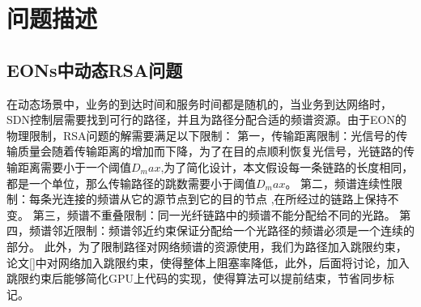 \section{问题描述}
\subsection{EONs中动态RSA问题}
  在动态场景中，业务的到达时间和服务时间都是随机的，当业务到达网络时，SDN控制层需要找到可行的路径，并且为路径分配合适的频谱资源。由于EON的物理限制，RSA问题的解需要满足以下限制：
第一，传输距离限制：光信号的传输质量会随着传输距离的增加而下降，为了在目的点顺利恢复光信号，光链路的传输距离需要小于一个阈值$D_max$,为了简化设计，本文假设每一条链路的长度相同，都是一个单位，那么传输路径的跳数需要小于阈值$D_max$。
第二，频谱连续性限制：每条光连接的频谱从它的源节点到它的目的节点 ,在所经过的链路上保持不变。
第三，频谱不重叠限制：同一光纤链路中的频谱不能分配给不同的光路。
第四，频谱邻近限制：频谱邻近约束保证分配给一个光路径的频谱必须是一个连续的部分。
 此外，为了限制路径对网络频谱的资源使用，我们为路径加入跳限约束，论文[]中对网络加入跳限约束，使得整体上阻塞率降低，此外，后面将讨论，加入跳限约束后能够简化GPU上代码的实现，使得算法可以提前结束，节省同步标记。
